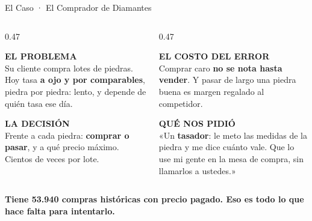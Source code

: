\documentclass[aspectratio=169, 11pt]{beamer}
\begin{document}
\begin{frame}[shrink=5]{El Caso · El Comprador de Diamantes}
  \vspace{-2pt}
  \begin{columns}[T]
    \begin{column}{0.47\textwidth}
      \begin{tcolorbox}[colback=arcaGray, colframe=arcaRed, boxrule=0pt,
        leftrule=3pt, arc=3pt, left=7pt, right=7pt, top=3pt, bottom=3pt]
        {\scriptsize\color{arcaRed}\bfseries EL PROBLEMA}\\[2pt]
        {\scriptsize\color{textMuted}
         Su cliente compra lotes de piedras. Hoy tasa \textbf{a ojo y por
         comparables}, piedra por piedra: lento, y depende de quién tasa
         ese día.}
      \end{tcolorbox}
      \vspace{2pt}
      \begin{tcolorbox}[colback=arcaGray, colframe=arcaDark, boxrule=0pt,
        leftrule=3pt, arc=3pt, left=7pt, right=7pt, top=3pt, bottom=3pt]
        {\scriptsize\color{arcaDark}\bfseries LA DECISIÓN}\\[2pt]
        {\scriptsize\color{textMuted}
         Frente a cada piedra: \textbf{comprar o pasar}, y a qué precio
         máximo. Cientos de veces por lote.}
      \end{tcolorbox}
    \end{column}
    \begin{column}{0.47\textwidth}
      \begin{tcolorbox}[colback=arcaGray, colframe=arcaDark, boxrule=0pt,
        leftrule=3pt, arc=3pt, left=7pt, right=7pt, top=3pt, bottom=3pt]
        {\scriptsize\color{arcaDark}\bfseries EL COSTO DEL ERROR}\\[2pt]
        {\scriptsize\color{textMuted}
         Comprar caro \textbf{no se nota hasta vender}. Y pasar de largo una
         piedra buena es margen regalado al competidor.}
      \end{tcolorbox}
      \vspace{2pt}
      \begin{tcolorbox}[colback=arcaGray, colframe=codeGreen, boxrule=0pt,
        leftrule=3pt, arc=3pt, left=7pt, right=7pt, top=3pt, bottom=3pt]
        {\scriptsize\color{codeGreen}\bfseries QUÉ NOS PIDIÓ}\\[2pt]
        {\scriptsize\color{textMuted}
         «Un \textbf{tasador}: le meto las medidas de la piedra y me dice
         cuánto vale. Que lo use mi gente en la mesa de compra, sin
         llamarlos a ustedes.»}
      \end{tcolorbox}
    \end{column}
  \end{columns}
  \vspace{2pt}
  {\scriptsize\color{arcaDark}\bfseries
   Tiene 53.940 compras históricas con precio pagado. Eso es todo lo que
   hace falta para intentarlo.}
\end{frame}
\end{document}
